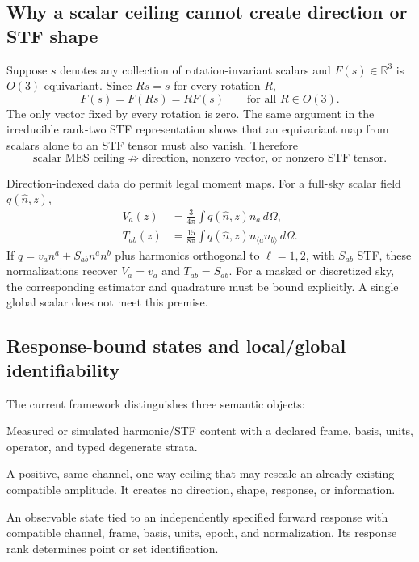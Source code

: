 \documentclass[11pt,a4paper]{article}
\begin{document}
\subsection{Why a scalar ceiling cannot create direction or STF shape}

Suppose $s$ denotes any collection of rotation-invariant scalars and
$F(s)\in\mathbb R^3$ is $O(3)$-equivariant.  Since $Rs=s$ for every rotation
$R$,
\[
F(s)=F(Rs)=R F(s)\qquad\text{for all }R\in O(3).
\]
The only vector fixed by every rotation is zero.  The same argument in the
irreducible rank-two STF representation shows that an equivariant map from
scalars alone to an STF tensor must also vanish.  Therefore
\[
\text{scalar MES ceiling}\not\Rightarrow
\text{direction, nonzero vector, or nonzero STF tensor}.
\]

Direction-indexed data do permit legal moment maps.  For a full-sky scalar
field $q(\widehat n,z)$,
\begin{align}
V_a(z)&=\frac{3}{4\pi}\int q(\widehat n,z)n_a\,d\Omega,
\label{eq:vector-moment}\\
T_{ab}(z)&=\frac{15}{8\pi}\int q(\widehat n,z)
n_{\langle a}n_{b\rangle}\,d\Omega.
\label{eq:stf-moment}
\end{align}
If $q=v_an^a+S_{ab}n^an^b$ plus harmonics orthogonal to $\ell=1,2$, with
$S_{ab}$ STF, these normalizations recover $V_a=v_a$ and $T_{ab}=S_{ab}$.
For a masked or discretized sky, the corresponding estimator and quadrature
must be bound explicitly.  A single global scalar does not meet this premise.

\subsection{Response-bound states and local/global identifiability}

The current framework distinguishes three semantic objects:
\begin{description}[leftmargin=3.2cm,style=nextline]
  \item[Observable irrep state] Measured or simulated harmonic/STF content
  with a declared frame, basis, units, operator, and typed degenerate strata.
  \item[MES normalizer] A positive, same-channel, one-way ceiling that may
  rescale an already existing compatible amplitude.  It creates no direction,
  shape, response, or information.
  \item[Response-bound state] An observable state tied to an independently
  specified forward response with compatible channel, frame, basis, units,
  epoch, and normalization.  Its response rank determines point or set
  identification.
\end{description}
\end{document}
